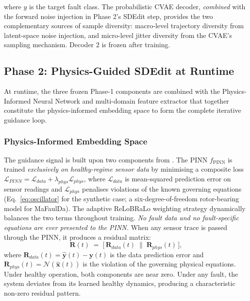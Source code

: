 \documentclass[conference]{IEEEtran}
\newcommand{\PINN}{f_{\text{PINN}}}
\newcommand{\x}{\mathbf{x}}
\newcommand{\R}{\mathbf{R}}
\begin{document}
where $y$ is the target fault class. The probabilistic CVAE decoder, \emph{combined} with the forward noise injection in Phase 2's SDEdit step, provides the two complementary sources of sample diversity: macro-level trajectory diversity from latent-space noise injection, and micro-level jitter diversity from the CVAE's sampling mechanism. Decoder 2 is frozen after training.

\subsection{Phase 2: Physics-Guided SDEdit at Runtime}
\label{subsec:phase2}

At runtime, the three frozen Phase-1 components are combined with the Physics-Informed Neural Network and multi-domain feature extractor \cite{spotorno2026linking} that together constitute the physics-informed embedding space to form the complete iterative guidance loop.

\subsubsection{Physics-Informed Embedding Space}

The guidance signal is built upon two components from \cite{spotorno2026linking}. The PINN $\PINN$ is trained \emph{exclusively on healthy-regime sensor data} by minimising a composite loss $\mathcal{L}_{PINN} = \mathcal{L}_{data} + \lambda_{phys}\mathcal{L}_{phys}$, where $\mathcal{L}_{data}$ is mean-squared prediction error on sensor readings and $\mathcal{L}_{phys}$ penalises violations of the known governing equations (Eq.~\eqref{eq:oscillator} for the synthetic case; a six-degree-of-freedom rotor-bearing model for MaFaulDa). The adaptive ReLoBRaLo weighting strategy \cite{spotorno2026linking} dynamically balances the two terms throughout training. \emph{No fault data and no fault-specific equations are ever presented to the PINN.} When any sensor trace is passed through the PINN, it produces a residual matrix:
\begin{equation}
  \R(t) \;=\;
  \bigl[\,\R_{data}(t)\;\|\;\R_{phys}(t)\,\bigr],
  \label{eq:residual}
\end{equation}
where $\R_{data}(t)=\hat{\mathbf{y}}(t)-\mathbf{y}(t)$ is the data prediction error and $\R_{phys}(t)=\mathcal{N}(\hat{\x}(t))$ is the violation of the governing physical equations. Under healthy operation, both components are near zero. Under any fault, the system deviates from its learned healthy dynamics, producing a characteristic non-zero residual pattern.
\end{document}
